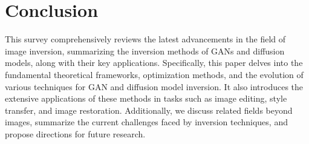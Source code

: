 \section{Conclusion} \label{sec:conclusion}

This survey comprehensively reviews the latest advancements in the field of image inversion, summarizing the inversion methods of GANs and diffusion models, along with their key applications. Specifically, this paper delves into the fundamental theoretical frameworks, optimization methods, and the evolution of various techniques for GAN and diffusion model inversion. It also introduces the extensive applications of these methods in tasks such as image editing, style transfer, and image restoration. Additionally, we discuss related fields beyond images, summarize the current challenges faced by inversion techniques, and propose directions for future research. 




